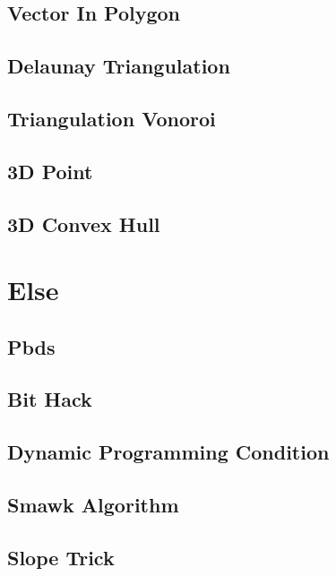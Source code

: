 \subsection{Vector In Polygon}
\subsection{Delaunay Triangulation}

\subsection{Triangulation Vonoroi}

\subsection{3D Point}

\subsection{3D Convex Hull}


\section{Else}
\subsection{Pbds}

\subsection{Bit Hack}

\subsection{Dynamic Programming Condition}

\subsection{Smawk Algorithm}

\subsection{Slope Trick}

% 
% 

